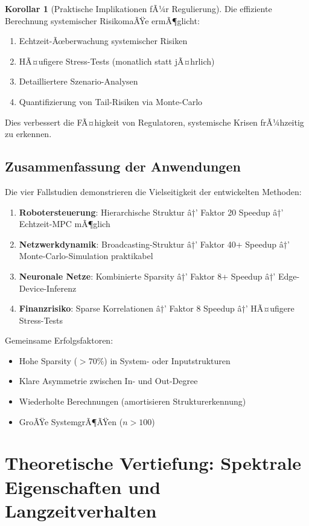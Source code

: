 ﻿\documentclass[a4paper,12pt]{report}
\theoremstyle{definition}
\newtheorem{korollar}{Korollar}
\begin{document}
	\begin{korollar}[Praktische Implikationen fÃ¼r Regulierung]
		Die effiziente Berechnung systemischer RisikomaÃŸe ermÃ¶glicht:
		\begin{enumerate}
			\item Echtzeit-Ãœberwachung systemischer Risiken
			\item HÃ¤ufigere Stress-Tests (monatlich statt jÃ¤hrlich)
			\item Detailliertere Szenario-Analysen
			\item Quantifizierung von Tail-Risiken via Monte-Carlo
		\end{enumerate}
		
		Dies verbessert die FÃ¤higkeit von Regulatoren, systemische Krisen frÃ¼hzeitig zu erkennen.
	\end{korollar}
	
	\section{Zusammenfassung der Anwendungen}
	
	Die vier Fallstudien demonstrieren die Vielseitigkeit der entwickelten Methoden:
	
	\begin{enumerate}
		\item \textbf{Robotersteuerung}: Hierarchische Struktur â†’ Faktor 20 Speedup â†’ Echtzeit-MPC mÃ¶glich
		\item \textbf{Netzwerkdynamik}: Broadcasting-Struktur â†’ Faktor 40+ Speedup â†’ Monte-Carlo-Simulation praktikabel
		\item \textbf{Neuronale Netze}: Kombinierte Sparsity â†’ Faktor 8+ Speedup â†’ Edge-Device-Inferenz
		\item \textbf{Finanzrisiko}: Sparse Korrelationen â†’ Faktor 8 Speedup â†’ HÃ¤ufigere Stress-Tests
	\end{enumerate}
	
	Gemeinsame Erfolgsfaktoren:
	\begin{itemize}
		\item Hohe Sparsity ($> 70\%$) in System- oder Inputstrukturen
		\item Klare Asymmetrie zwischen In- und Out-Degree
		\item Wiederholte Berechnungen (amortisieren Strukturerkennung)
		\item GroÃŸe SystemgrÃ¶ÃŸen ($n > 100$)
	\end{itemize}
	
	\chapter{Theoretische Vertiefung: Spektrale Eigenschaften und Langzeitverhalten}
	
\end{document}
